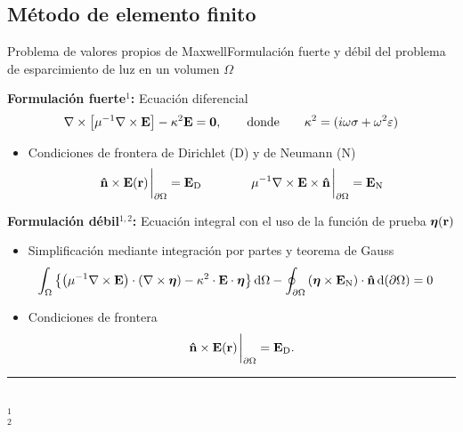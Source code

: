 

\subsection{Método de elemento finito}

\begin{frame}{Problema de valores propios de Maxwell}{Formulación fuerte y débil del problema de esparcimiento de luz en un volumen $\Omega$}
\small
\begin{alertblock}{\textbf{Formulación fuerte$^1$:} Ecuación diferencial}
				\begin{align*}
					 \nabla \times \qty[\mu^{-1} \nabla \times \vb{E}] - \kappa^2 \vb{E} = \vb{0},
        \qquad
        \text{donde}
        \qquad
        \kappa^2 = (i\omega\sigma +\omega^2 \varepsilon)
    \end{align*}
        \begin{itemize}%
         \item  Condiciones de frontera de Dirichlet (D) y de Neumann (N)\vspace*{-.5em}	
    \begin{align*}
    \vu{n}\times \vb{E}(\vb{r})\eval_{\partial \Omega} = \vb{E}_\text{D}
        \qquad\qquad
    \mu^{-1} \nabla \times \vb{E} \times \vu{n} \eval_{\partial \Omega} =  \vb{E}_\text{N}
					\end{align*}
			\end{itemize}
		\end{alertblock}
	
	\begin{alertblock}{\textbf{Formulación  débil$^{1,2}$:} Ecuación integral con el uso de la función de prueba $\boldsymbol{\eta}(\vb{r})$}
        \begin{itemize}%
         \item Simplificación mediante integración por partes y teorema de Gauss
					\begin{align*}
					    \int_\Omega \left\{\qty(\mu^{-1}\nabla\times\vb{E})\cdot \qty(\nabla\times\boldsymbol{\eta}) -  \kappa^2  \cdot   \vb{E} \cdot \boldsymbol{\eta} \right\} \dd{\Omega} & - \oint_{\partial\Omega} \qty(\boldsymbol{\eta}\times \vb{E}_\text{N})  \cdot\vu{n}\dd{(\partial\Omega)} = 0
    \end{align*}
    \item Condiciones de frontera \vspace*{-.5em} $$\vu{n}\times \vb{E}(\vb{r})\eval_{\partial \Omega} = \vb{E}_\text{D}.$$
			\end{itemize}
		\end{alertblock}
	
	\noindent\rule{.25\textwidth}{0.4pt}\\    
   \fontsize{4}{5} \selectfont
	$^1$ \\
	$^2$   

\end{frame}

